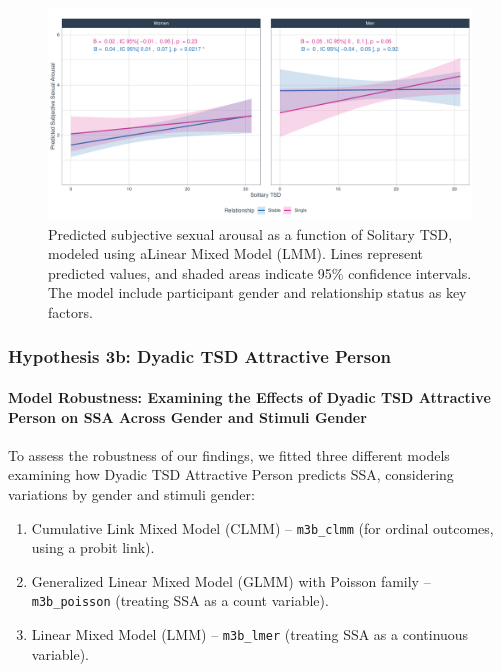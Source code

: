 \documentclass[
  bookmarksnumbered]{article}
\providecommand{\tightlist}{%
  \setlength{\itemsep}{0pt}\setlength{\parskip}{0pt}}
\begin{document}
\begin{figure}
\centering
\includegraphics{Sexual_Desire_Arousal_files/figure-latex/fig-h3a-1.pdf}
\caption{\label{fig:fig-h3a}Predicted subjective sexual arousal as a function of Solitary TSD, modeled using aLinear Mixed Model (LMM). Lines represent predicted values, and shaded areas indicate 95\% confidence intervals. The model include participant gender and relationship status as key factors.}
\end{figure}

\subsubsection{Hypothesis 3b: Dyadic TSD Attractive Person}\label{hyp3b}

\paragraph{Model Robustness: Examining the Effects of Dyadic TSD Attractive Person on SSA Across Gender and Stimuli Gender}\label{model-robustness-examining-the-effects-of-dyadic-tsd-attractive-person-on-ssa-across-gender-and-stimuli-gender-1}

To assess the robustness of our findings, we fitted three different models examining how Dyadic TSD Attractive Person predicts SSA, considering variations by gender and stimuli gender:

\begin{enumerate}
\def\labelenumi{\arabic{enumi}.}
\tightlist
\item
  Cumulative Link Mixed Model (CLMM) -- \texttt{m3b\_clmm} (for ordinal outcomes, using a probit link).
\item
  Generalized Linear Mixed Model (GLMM) with Poisson family -- \texttt{m3b\_poisson} (treating SSA as a count variable).
\item
  Linear Mixed Model (LMM) -- \texttt{m3b\_lmer} (treating SSA as a continuous variable).
\end{enumerate}
\end{document}
